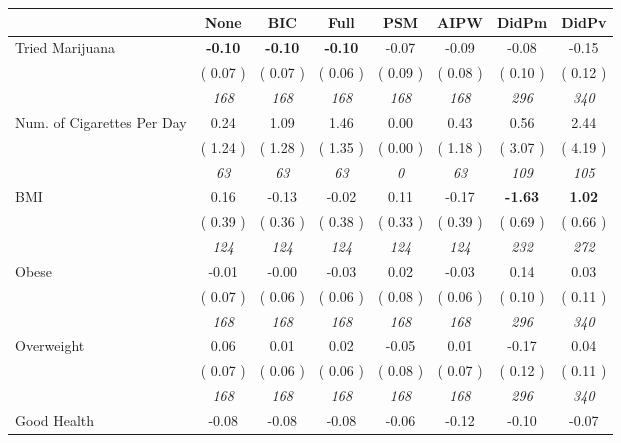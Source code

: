 \begin{tabular}{l c c c c c c c}
\toprule
 & None & BIC & Full & PSM & AIPW & DidPm & DidPv \\
\midrule
Tried Marijuana & \textbf{     -0.10 } & \textbf{     -0.10 } & \textbf{     -0.10 } &     -0.07 &     -0.09 &     -0.08 &     -0.15 \\
& (     0.07 ) & (     0.07 ) & (     0.06 ) & (     0.09 ) & (     0.08 ) & (     0.10 ) & (     0.12 ) \\
& \textit{ 168 } & \textit{ 168 } & \textit{ 168 } & \textit{ 168 } & \textit{ 168 } & \textit{ 296 } & \textit{ 340 } \\
Num. of Cigarettes Per Day &      0.24 &      1.09 &      1.46 &      0.00 &      0.43 &      0.56 &      2.44 \\
& (     1.24 ) & (     1.28 ) & (     1.35 ) & (     0.00 ) & (     1.18 ) & (     3.07 ) & (     4.19 ) \\
& \textit{ 63 } & \textit{ 63 } & \textit{ 63 } & \textit{ 0 } & \textit{ 63 } & \textit{ 109 } & \textit{ 105 } \\
BMI &      0.16 &     -0.13 &     -0.02 &      0.11 &     -0.17 & \textbf{     -1.63 } & \textbf{      1.02 } \\
& (     0.39 ) & (     0.36 ) & (     0.38 ) & (     0.33 ) & (     0.39 ) & (     0.69 ) & (     0.66 ) \\
& \textit{ 124 } & \textit{ 124 } & \textit{ 124 } & \textit{ 124 } & \textit{ 124 } & \textit{ 232 } & \textit{ 272 } \\
Obese &     -0.01 &     -0.00 &     -0.03 &      0.02 &     -0.03 &      0.14 &      0.03 \\
& (     0.07 ) & (     0.06 ) & (     0.06 ) & (     0.08 ) & (     0.06 ) & (     0.10 ) & (     0.11 ) \\
& \textit{ 168 } & \textit{ 168 } & \textit{ 168 } & \textit{ 168 } & \textit{ 168 } & \textit{ 296 } & \textit{ 340 } \\
Overweight &      0.06 &      0.01 &      0.02 &     -0.05 &      0.01 &     -0.17 &      0.04 \\
& (     0.07 ) & (     0.06 ) & (     0.06 ) & (     0.08 ) & (     0.07 ) & (     0.12 ) & (     0.11 ) \\
& \textit{ 168 } & \textit{ 168 } & \textit{ 168 } & \textit{ 168 } & \textit{ 168 } & \textit{ 296 } & \textit{ 340 } \\
Good Health &     -0.08 &     -0.08 &     -0.08 &     -0.06 &     -0.12 &     -0.10 &     -0.07 \\

\end{tabular}
